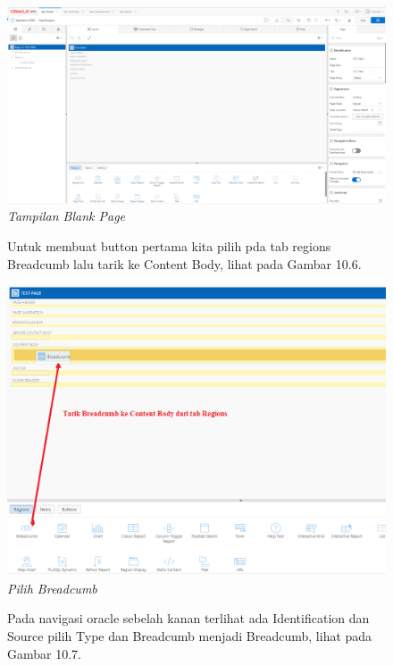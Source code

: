 \begin{enumerate}
\begin{figure}
        \centering
        \includegraphics[scale=0.2]{figures/bab10/5.png}
        \caption{\textit{Tampilan Blank Page}}
        \label{}
    \end{figure}
    \begin{figure}
    \item Untuk membuat button pertama kita pilih pda tab regions Breadcumb lalu tarik ke Content Body, lihat pada Gambar 10.6.
	
        \centering
        \includegraphics[scale=0.4]{figures/bab10/6.png}
        \caption{\textit{Pilih Breadcumb}}
        \label{Pilih Breadcumb}
    \end{figure}
    
	\begin{figure}
	\item Pada navigasi oracle sebelah kanan terlihat ada Identification dan Source pilih Type dan Breadcumb menjadi Breadcumb, lihat pada Gambar 10.7.
	

\end{figure}
\end{enumerate}
